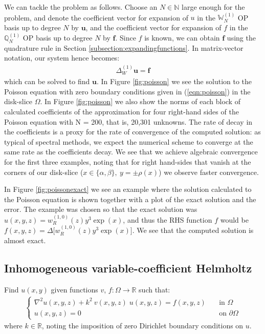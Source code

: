 \documentclass[11pt, oneside]{article}   	%
\newcommand{\bstodo}{\todo[color=pink]}
\newcommand{\R}{\mathbb{R}}
\newcommand{\N}{\mathbb{N}}
\newcommand{\genjac}{R}
\newcommand{\genjacw}{w_\genjac}
\newcommand{\bigscop}{{\mathbb{Q}}}
\newcommand{\bigWNi}{\mathbb{W}_N^{(1)}}
\newcommand{\bigscopi}{\bigscop^{(1)}}
\newcommand{\bigscopNi}{\bigscopi_{N}}
\begin{document}
We can tackle the problem as follows. Choose an $N \in \N$ large enough for the problem, and denote the coefficient vector for expansion of $u$ in the $\bigWNi$ OP basis up to degree $N$ by $\mathbf{u}$, and the coefficient vector for expansion of $f$ in the $\bigscopNi$ OP basis up to degree $N$ by $\mathbf{f}$. Since $f$ is known, we can obtain $\mathbf{f}$ using the quadrature rule in Section \ref{subsection:expandingfunctions}. In matrix-vector notation, our system hence becomes:
\begin{align*}
    \Delta_W^{(1)} \mathbf{u} = \mathbf{f}
\end{align*}
which can be solved to find $\mathbf{u}$.
In Figure \ref{fig:poisson} we see the solution to the Poisson equation with zero boundary conditions given in (\ref{eqn:poisson}) in the disk-slice $\Omega$. In Figure \ref{fig:poisson} we also show the norms of each block of calculated coefficients of the approximation for four right-hand sides of the Poisson equation with N = 200, that is, 20,301 unknowns. The rate of decay in the coefficients is a proxy for the rate of convergence of the computed solution: as typical of spectral methods, we expect the numerical scheme to converge at the same rate as the coefficients decay. We see that we achieve algebraic convergence for the first three examples, noting that for right hand-sides that vanish at the corners of our disk-slice ($x\in\{\alpha,\beta\}, \: y = \pm \rho(x)$) we observe faster convergence. \bstodo{get figs and update the comments here}

In Figure \ref{fig:poissonexact} we see an example where the solution calculated to the Poisson equation is shown together with a plot of the exact solution and the error. The example was chosen so that the exact solution was $u(x,y,z) = \genjacw^{(1,0)}(z) y^3 \exp(x)$, and thus the RHS function $f$ would be $f(x,y,z) = \Delta \big[\genjacw^{(1,0)}(z) y^3 \exp(x)\big]$. We see that the computed solution is almost exact. 


\subsection{Inhomogeneous variable-coefficient Helmholtz}

Find \(u(x,y)\) given functions $v$, $f : \Omega \to \R$ such that:
\begin{align}
	\begin{cases}
    		\nabla^2 u(x,y,z) + k^2 \: v(x,y,z) \; u(x,y,z) = f(x,y,z) &\quad \text{in } \Omega \\
		u(x,y,z) = 0 &\quad \text{on } \partial \Omega
	\end{cases}
	\label{eqn:helmholtz}
\end{align}
where $k \in \R$, noting the imposition of zero Dirichlet boundary conditions on $u$.
\end{document}
